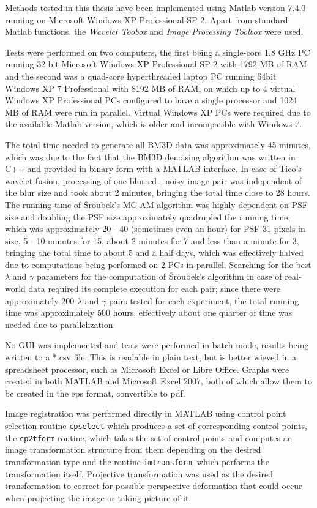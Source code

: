 \documentclass[12pt,notitlepage]{report}
\begin{document}
Methods tested in this thesis have been implemented using Matlab version 7.4.0 running on Microsoft Windows XP Professional SP 2. Apart from standard Matlab functions, the {\em Wavelet Toobox} and {\em Image Processing Toolbox} were used.

Tests were performed on two computers, the first being a single-core 1.8 GHz PC running 32-bit Microsoft Windows XP Professional SP 2 with 1792 MB of RAM and the second was a quad-core hyperthreaded laptop PC running 64bit 
Windows XP 7 Professional with 8192 MB of RAM, on which up to 4 virtual Windows XP Professional PCs configured to have a single processor and 1024 MB of RAM were run in parallel. Virtual Windows XP PCs were required due to the available Matlab version, which is older and incompatible with Windows 7.

The total time needed to generate all BM3D data was approximately 45 minutes, which was due to the fact that the BM3D denoising algorithm was written in C++ and provided in binary form with a MATLAB interface. In case of Tico's wavelet fusion, processing of one blurred - noisy image pair was independent of the blur size and took about 2 minutes, bringing the total time close to 28 hours. The running time of Šroubek's MC-AM algorithm was highly dependent on PSF size and doubling the PSF size approximately quadrupled the running time, which was approximately 20 - 40 (sometimes even an hour) for PSF 31 pixels in size, 5 - 10 minutes for 15, about 2 minutes for 7 and less than a minute for 3, bringing the total time to about 5 and a half days, which was effectively halved due to computations being performed on 2 PCs in parallel. Searching for the best $\lambda$ and $\gamma$ parameters for the computation of Šroubek's algorithm in case of real-world data required its complete execution for each pair; since there were approximately 200 $\lambda$ and $\gamma$ pairs tested for each experiment, the total running time was approximately 500 hours, effectively about one quarter of time was needed due to parallelization.  

No GUI was implemented and tests were performed in batch mode, results being written to a *.csv file. This is readable in plain text, but is better wieved in a spreadsheet processor, such as Microsoft Excel or Libre Office. Graphs were created in both MATLAB and Microsoft Excel 2007, both of which allow them to be created in the eps format, convertible to pdf. 

Image registration was performed directly in MATLAB using control point selection routine \texttt{cpselect} which produces a set of corresponding control points, the \texttt{cp2tform} routine, which takes the set of control points and computes an image transformation structure from them depending on the desired transformation type and the routine \texttt{imtransform}, which performs the transformation itself. Projective transformation was used as the desired transformation to correct for possible perspective deformation that could occur when projecting the image or taking picture of it.  
\end{document}
